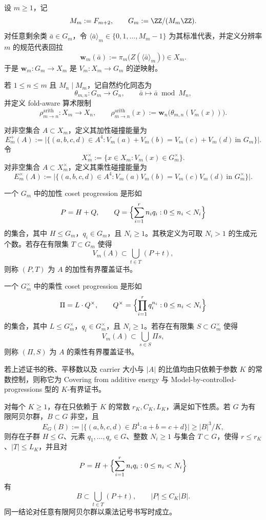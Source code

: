 \begin{definition}\label{distill:breuillard_green_tao_approximate_groups_and_helfgott_growth-arithmetic_coincidence_to_model_theorem-fold-aware-covering-certificate}
设 \(m\ge 1\)，记
\[
M_m:=F_{m+2},\qquad G_m:=\ZZ/(M_m\ZZ).
\]
对任意剩余类 \(\bar a\in G_m\)，令 \(\langle \bar a\rangle_m\in\{0,1,\dots,M_m-1\}\) 为其标准代表，并定义分辨率 \(m\) 的规范代表回拉
\[
\mathbf w_m(\bar a):=\pi_m\bigl(Z(\langle \bar a\rangle_m)\bigr)\in X_m.
\]
于是 \(\mathbf w_m:G_m\to X_m\) 是 \(V_m:X_m\to G_m\) 的逆映射。

若 \(1\le n\le m\) 且 \(M_n\mid M_m\)，记自然约化同态为
\[
\theta_{m,n}:G_m\longrightarrow G_n,\qquad \bar a\longmapsto \bar a\bmod M_n,
\]
并定义 fold-aware 算术限制
\[
\rho^{\mathrm{arith}}_{m\to n}:X_m\longrightarrow X_n,\qquad
\rho^{\mathrm{arith}}_{m\to n}(x):=\mathbf w_n\bigl(\theta_{m,n}(V_m(x))\bigr).
\]

对非空集合 \(A\subset X_m\)，定义其加性碰撞能量为
\[
E_m^+(A):=\bigl|\{(a,b,c,d)\in A^4:
V_m(a)+V_m(b)=V_m(c)+V_m(d)\ \text{in }G_m\}\bigr|.
\]
令
\[
X_m^\times:=\{x\in X_m:V_m(x)\in G_m^\times\}.
\]
对非空集合 \(A\subset X_m^\times\)，定义其乘性碰撞能量为
\[
E_m^\times(A):=\bigl|\{(a,b,c,d)\in A^4:
V_m(a)V_m(b)=V_m(c)V_m(d)\ \text{in }G_m^\times\}\bigr|.
\]

一个 \(G_m\) 中的加性 coset progression 是形如
\[
P=H+Q,\qquad
Q=\Bigl\{\sum_{i=1}^{r} n_i q_i:0\le n_i<N_i\Bigr\}
\]
的集合，其中 \(H\le G_m\)，\(q_i\in G_m\)，且 \(N_i\ge 1\)。其秩定义为可取 \(N_i>1\) 的生成元个数。若存在有限集 \(T\subset G_m\) 使得
\[
V_m(A)\subset \bigcup_{t\in T}(P+t),
\]
则称 \((P,T)\) 为 \(A\) 的加性有界覆盖证书。

一个 \(G_m^\times\) 中的乘性 coset progression 是形如
\[
\Pi=L\cdot Q^\times,\qquad
Q^\times=\Bigl\{\prod_{i=1}^{r} q_i^{n_i}:0\le n_i<N_i\Bigr\}
\]
的集合，其中 \(L\le G_m^\times\)，\(q_i\in G_m^\times\)，且 \(N_i\ge 1\)。若存在有限集 \(S\subset G_m^\times\) 使得
\[
V_m(A)\subset \bigcup_{s\in S}\Pi s,
\]
则称 \((\Pi,S)\) 为 \(A\) 的乘性有界覆盖证书。

若上述证书的秩、平移数以及 carrier 大小与 \(|A|\) 的比值均由只依赖于参数 \(K\) 的常数控制，则称它为 Covering from additive energy 与 Model-by-controlled-progressions 型的 \(K\)-有界证书。
\end{definition}
\begin{lemma}[有限阿贝尔群中的能量覆盖工具]\label{distill:breuillard_green_tao_approximate_groups_and_helfgott_growth-arithmetic_coincidence_to_model_theorem-finite-abelian-energy-covering-tool}
对每个 \(K\ge 1\)，存在只依赖于 \(K\) 的常数 \(r_K,C_K,L_K\)，满足如下性质。若 \(G\) 为有限阿贝尔群，\(B\subset G\) 非空，且
\[
E_G(B):=\bigl|\{(a,b,c,d)\in B^4:a+b=c+d\}\bigr|\ge |B|^3/K,
\]
则存在子群 \(H\le G\)、元素 \(q_1,\dots,q_r\in G\)、整数 \(N_i\ge 1\) 与集合 \(T\subset G\)，使得 \(r\le r_K\)、\(|T|\le L_K\)，并且对
\[
P=H+\Bigl\{\sum_{i=1}^{r}n_iq_i:0\le n_i<N_i\Bigr\}
\]
有
\[
B\subset \bigcup_{t\in T}(P+t),\qquad |P|\le C_K|B|.
\]
同一结论对任意有限阿贝尔群以乘法记号书写时成立。
\end{lemma}
